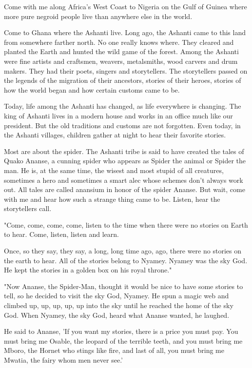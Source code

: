 Come with me along Africa's West Coast to Nigeria on the Gulf of Guinea where more pure negroid people live than anywhere else in the world.

Come to Ghana where the Ashanti live. Long ago, the Ashanti came to this land from somewhere farther north. No one really knows where. They cleared and planted the Earth and hunted the wild game of the forest. Among the Ashanti were fine artists and craftsmen, weavers, metalsmiths, wood carvers and drum makers. They had their poets, singers and storytellers. The storytellers passed on the legends of the migration of their ancestors, stories of their heroes, stories of how the world began and how certain customs came to be.

Today, life among the Ashanti has changed, as life everywhere is changing. The king of Ashanti lives in a modern house and works in an office much like our president. But the old traditions and customs are not forgotten. Even today, in the Ashanti villages, children gather at night to hear their favorite stories.

Most are about the spider. The Ashanti tribe is said to have created the tales of Quako Ananse, a cunning spider who appears as Spider the animal or Spider the man. He is, at the same time, the wisest and most stupid of all creatures, sometimes a hero and sometimes a smart alec whose schemes don't always work out. All tales are called anansium in honor of the spider Ananse. But wait, come with me and hear how such a strange thing came to be. Listen, hear the storytellers call.

"Come, come, come, come, listen to the time when there were no stories on Earth to hear. Come, listen, listen and learn.

Once, so they say, they say, a long, long time ago, ago, there were no stories on the earth to hear. All of the stories belong to Nyamey. Nyamey was the sky God. He kept the stories in a golden box on his royal throne."

"Now Ananse, the Spider-Man, thought it would be nice to have some stories to tell, so he decided to visit the sky God, Nyamey. He spun a magic web and climbed up, up, up, up, up into the sky until he reached the home of the sky God. When Nyamey, the sky God, heard what Ananse wanted, he laughed.

He said to Ananse, 'If you want my stories, there is a price you must pay. You must bring me Osable, the leopard of the terrible teeth, and you must bring me Mboro, the Hornet who stings like fire, and last of all, you must bring me Mwatia, the fairy whom men never see.'

